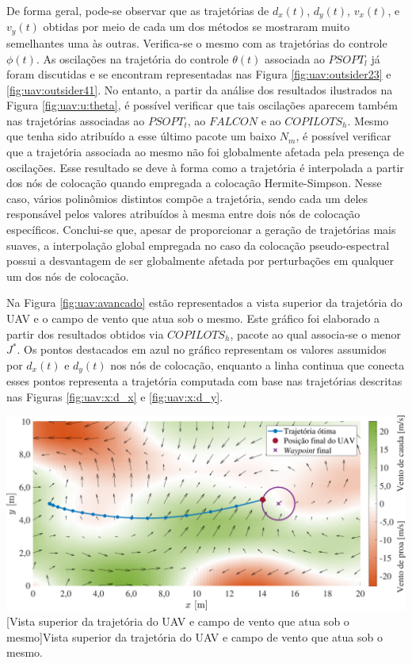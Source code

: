 De forma geral, pode-se observar que as trajetórias de $ d_x(t) $, $ d_y(t) $, $ v_x(t) $, e $ v_y(t) $ obtidas por meio de cada um dos métodos se mostraram muito semelhantes uma às outras. Verifica-se o mesmo com as trajetórias do controle $ \phi(t) $. As oscilações na trajetória do controle $ \theta(t) $ associada ao $ PSOPT_l $ já foram discutidas e se encontram representadas nas Figura \ref{fig:uav:outsider23} e \ref{fig:uav:outsider41}. No entanto, a partir da análise dos resultados ilustrados na Figura \ref{fig:uav:u:theta}, é possível verificar que tais oscilações aparecem também nas trajetórias associadas ao $ PSOPT_t $, ao $ FALCON $ e ao $ COPILOTS_h $. Mesmo que tenha sido atribuído a esse último pacote um baixo $ N_m $, é possível verificar que a trajetória associada ao mesmo não foi globalmente afetada pela presença de oscilações. Esse resultado se deve à forma como a trajetória é interpolada a partir dos nós de colocação quando empregada a colocação Hermite-Simpson. Nesse caso, vários polinômios distintos compõe a trajetória, sendo cada um deles responsável pelos valores atribuídos à mesma entre dois nós de colocação específicos. Conclui-se que, apesar de proporcionar a geração de trajetórias mais suaves, a interpolação global empregada no caso da colocação pseudo-espectral possui a desvantagem de ser globalmente afetada por perturbações em qualquer um dos nós de colocação. 


Na Figura \ref{fig:uav:avancado} estão representados a vista superior da trajetória do UAV e o campo de vento que atua sob o mesmo. Este gráfico foi elaborado a partir dos resultados obtidos via $ COPILOTS_h $, pacote ao qual associa-se o menor $ J^* $. Os pontos destacados em azul no gráfico representam os valores assumidos por $ d_x(t) $ e $ d_y(t) $ nos nós de colocação, enquanto a linha continua que conecta esses pontos representa a trajetória computada com base nas trajetórias descritas nas Figuras \ref{fig:uav:x:d_x} e  \ref{fig:uav:x:d_y}. 

\noindent
\begin{minipage}{\textwidth}
	\vspace{\onelineskip}
	\centering
	\includegraphics[scale=0.55]{fig/resultados/uav/obs/adv}
	[Vista superior da trajetória do UAV e campo de vento que atua sob o mesmo]{Vista superior da trajetória do UAV e campo de vento que atua sob o mesmo.}
	\label{fig:uav:avancado}
	\vspace{\onelineskip}
\end{minipage}

